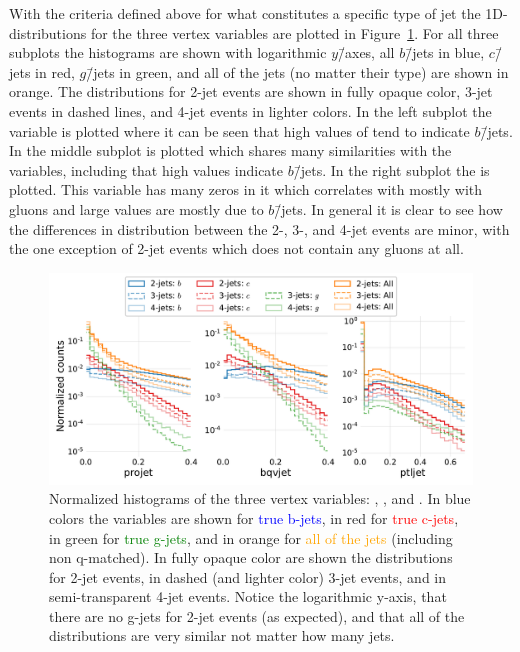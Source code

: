 With the criteria defined above for what constitutes a specific type of jet the 1D-distributions for the three vertex variables are plotted in Figure~\ref{fig:q:vertex_variables}. For all three subplots the histograms are shown with logarithmic $y$\=/axes, all $b$\=/jets in blue, $c$\=/jets in red, $g$\=/jets in green, and all of the jets (no matter their type) are shown in orange. The distributions for 2-jet events are shown in fully opaque color, 3-jet events in dashed lines, and 4-jet events in lighter colors. In the left subplot the  variable is plotted where it can be seen that high values of  tend to indicate $b$\=/jets. In the middle subplot  is plotted which shares many similarities with the  variables, including that high values indicate $b$\=/jets. In the right subplot the  is plotted. This variable has many zeros in it which correlates with mostly with gluons and large values are mostly due to $b$\=/jets. In general it is clear to see how the differences in distribution between the \num{2}-, \num{3}-, and \num{4}-jet events are minor, with the one exception of \num{2}-jet events which does not contain any gluons at all. 

\begin{figure}[h!]
  \includegraphics[width=1\textwidth, trim=10 10 5 5, clip]{figures/quarks/btagging_variables_hist-down_sample=1.00-ML_vars=vertex-selection=b-ejet_min=4-n_iter_RS_lgb=99-n_iter_RS_xgb=9-cdot_cut=0.90-version=19.pdf}
  \caption[Histograms of the Vertex Variables]
          {Normalized histograms of the three vertex variables: , , and . In blue colors the variables are shown for \textcolor{blue}{true b-jets}, in red for \textcolor{red}{true c-jets}, in green for \textcolor{green}{true g-jets}, and in orange for \textcolor{orange}{all of the jets} (including non q-matched). In fully opaque color are shown the distributions for 2-jet events, in dashed (and lighter color) 3-jet events, and in semi-transparent 4-jet events. Notice the logarithmic y-axis, that there are no g-jets for 2-jet events (as expected), and that all of the distributions are very similar not matter how many jets.
          } 
  \label{fig:q:vertex_variables}
\end{figure}

